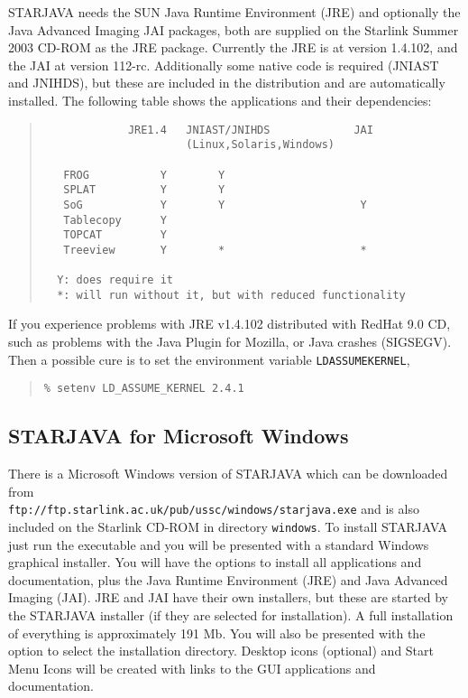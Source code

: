 \documentclass[twoside,11pt]{article}
\newcommand{\htmladdnormallink}[2]{#1}
\newcommand{\xlabel}[1]{}
\renewcommand{\_}{\texttt{\symbol{95}}}
\begin{document}
STARJAVA needs the SUN Java Runtime Environment (JRE) and optionally the Java
Advanced Imaging JAI packages, both are supplied on the Starlink Summer 2003 CD-ROM
as the JRE package. Currently the JRE is at version 1.4.1\_02, and the JAI at 
version 1\_1\_2-rc. Additionally some native code is required (JNIAST and JNIHDS),
but these are included in the distribution and are automatically installed. The 
following table shows the applications and their dependencies:
\pagebreak
\begin{quote}
\begin{verbatim}
             JRE1.4   JNIAST/JNIHDS             JAI
                      (Linux,Solaris,Windows)

   FROG           Y        Y
   SPLAT          Y        Y
   SoG            Y        Y                     Y
   Tablecopy      Y
   TOPCAT         Y
   Treeview       Y        *                     *

  Y: does require it
  *: will run without it, but with reduced functionality
\end{verbatim}
\end{quote}

If you experience problems with JRE v1.4.1\_02 distributed with
RedHat 9.0 CD, such as problems with the Java Plugin for Mozilla,
or Java crashes (SIGSEGV). Then a possible
cure is to set the environment variable \texttt{LD\_ASSUME\_KERNEL},

\begin{quote}
\begin{verbatim}
% setenv LD_ASSUME_KERNEL 2.4.1
\end{verbatim}
\end{quote}

\subsection{\label{windows}\xlabel{windows}STARJAVA for Microsoft Windows}

There is a Microsoft Windows version of STARJAVA which can be downloaded from \\
\htmladdnormallink{\texttt{ftp://ftp.starlink.ac.uk/pub/ussc/windows/starjava.exe}}{ftp://ftp.starlink.ac.uk/pub/ussc/windows/starjava.exe} 
and is also included on the Starlink CD-ROM in directory \texttt{windows}. 
To install STARJAVA just run the executable and you will be presented with a standard 
Windows graphical installer. You will have the options to install all applications and 
documentation, plus the Java Runtime Environment (JRE) and Java Advanced Imaging (JAI). 
JRE and JAI have their own installers, but these are started by the STARJAVA installer 
(if they are selected for installation). A full installation of everything is approximately 
191 Mb. You will also be presented with the option to select the installation directory.
Desktop icons (optional) and Start Menu Icons will be created with links to the 
GUI applications and documentation.
\end{document}

